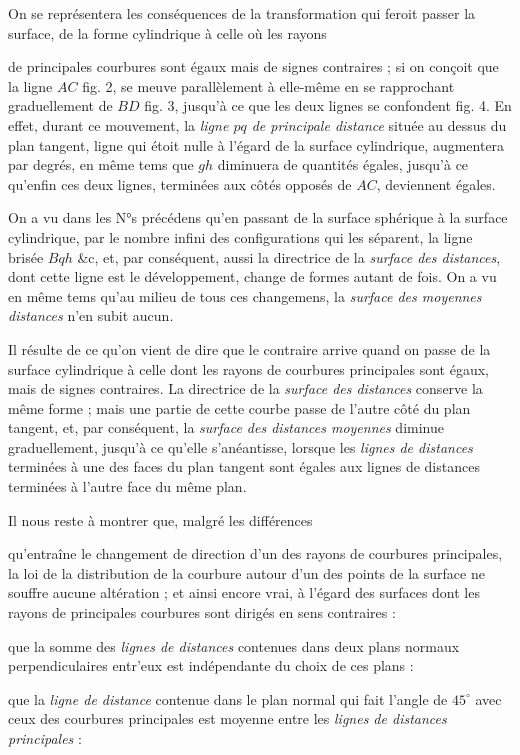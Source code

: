 \documentclass[11pt,a4paper]{article}
\begin{document}
On se représentera les conséquences de la transformation qui feroit
passer la surface, de la forme cylindrique à celle où les rayons

de principales courbures sont égaux mais de signes contraires ; si on
conçoit que la ligne $AC$ fig. 2, se meuve parallèlement à elle-même
en se rapprochant graduellement de $BD$ fig. 3, jusqu'à ce que les deux
lignes se confondent fig. 4. En effet, durant ce mouvement, la
\emph{ligne $pq$ de principale distance} située au dessus du plan
tangent, ligne qui étoit nulle à l'égard de la surface cylindrique,
augmentera par degrés, en même tems que $gh$ diminuera de quantités
égales, jusqu'à ce qu'enfin ces deux lignes, terminées aux côtés
opposés de $AC$, deviennent égales.

On a vu dans les N°s précédens qu'en passant de la
surface sphérique à la surface cylindrique, par le nombre infini des
configurations qui les séparent, la ligne brisée $Bqh$ \&c, et, par
conséquent, aussi la directrice de la \emph{surface des distances},
dont cette ligne est le développement, change de formes autant de
fois. On a vu en même tems qu'au milieu de tous ces changemens, la
\emph{surface des moyennes distances} n'en subit aucun.

Il résulte de ce qu'on vient de dire que le contraire arrive quand on
passe de la surface cylindrique à celle dont les rayons de courbures
principales sont égaux, mais de signes contraires. La directrice de la
\emph{surface des distances} conserve la même forme ; mais une partie
de cette courbe passe de l'autre côté du plan tangent, et, par
conséquent, la \emph{surface des distances moyennes} diminue
graduellement, jusqu'à ce qu'elle s'anéantisse, lorsque les
\emph{lignes de distances} terminées à une des faces du plan tangent
sont égales aux lignes de distances terminées à l'autre face du même
plan.

Il nous reste à montrer que, malgré les différences

qu'entraîne le changement de direction d'un des rayons de courbures
principales, la loi de la distribution de la courbure autour d'un des
points de la surface ne souffre aucune altération ; et ainsi
 encore vrai, à l'égard des surfaces dont les
rayons de principales courbures sont dirigés en sens contraires :

que la somme des \emph{lignes de distances} contenues dans deux plans
normaux perpendiculaires entr'eux est indépendante du choix de ces
plans :

que la \emph{ligne de distance} contenue dans le plan normal qui fait
l'angle de $45^\circ$ avec ceux des courbures principales est moyenne
entre les \emph{lignes de distances principales} :
\end{document}
